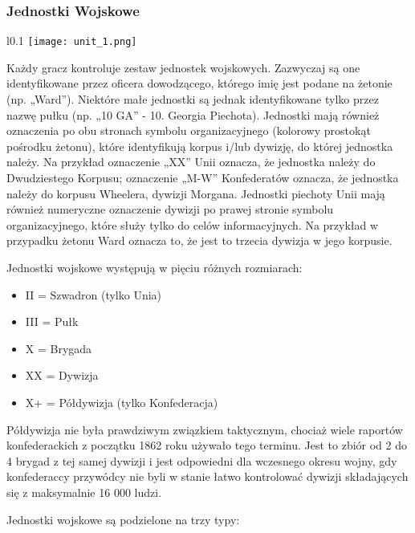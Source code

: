 \subsubsection*{Jednostki Wojskowe}
\begin{wrapfigure}{l}{0.1\textwidth}
  \texttt{[image: unit\_1.png]}
\end{wrapfigure}
Każdy gracz kontroluje zestaw jednostek wojskowych. Zazwyczaj są one identyfikowane przez oficera dowodzącego, którego imię jest podane na żetonie (np. „Ward”). Niektóre małe jednostki są jednak identyfikowane tylko przez nazwę pułku (np. „10 GA” - 10. Georgia Piechota). Jednostki mają również oznaczenia po obu stronach symbolu organizacyjnego (kolorowy prostokąt pośrodku żetonu), które identyfikują korpus i/lub dywizję, do której jednostka należy. Na przykład oznaczenie „XX” Unii oznacza, że jednostka należy do Dwudziestego Korpusu; oznaczenie „M-W” Konfederatów oznacza, że jednostka należy do korpusu Wheelera, dywizji Morgana. Jednostki piechoty Unii mają również numeryczne oznaczenie dywizji po prawej stronie symbolu organizacyjnego, które służy tylko do celów informacyjnych. Na przykład w przypadku żetonu Ward oznacza to, że jest to trzecia dywizja w jego korpusie.\par
Jednostki wojskowe występują w pięciu różnych rozmiarach:
\begin{itemize}
  \item[] II = Szwadron (tylko Unia)
  \item[] III = Pułk
  \item[] X = Brygada
  \item[] XX = Dywizja
  \item[] X+ = Półdywizja (tylko Konfederacja)
\end{itemize}
Półdywizja nie była prawdziwym związkiem taktycznym, chociaż wiele raportów konfederackich z początku 1862 roku używało tego terminu. Jest to zbiór od 2 do 4 brygad z tej samej dywizji i jest odpowiedni dla wczesnego okresu wojny, gdy konfederaccy przywódcy nie byli w stanie łatwo kontrolować dywizji składających się z maksymalnie 16 000 ludzi.\par
Jednostki wojskowe są podzielone na trzy typy:
